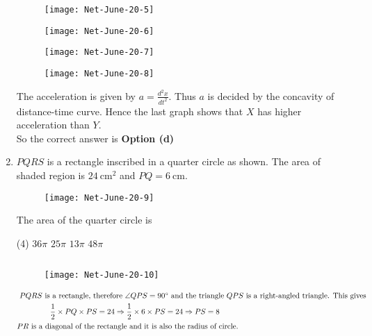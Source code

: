 \begin{enumerate}
\begin{tasks}
	\task[\textbf{a.}]
	\begin{figure}[H]
		\centering
		\texttt{[image: Net-June-20-5]}
	\end{figure}
	\task[\textbf{b.}]
		\begin{figure}[H]
		\centering
		\texttt{[image: Net-June-20-6]}
	\end{figure}
	\task[\textbf{c.}]
		\begin{figure}[H]
		\centering
		\texttt{[image: Net-June-20-7]}
	\end{figure}
	\task[\textbf{d.}] 
		\begin{figure}[H]
		\centering
		\texttt{[image: Net-June-20-8]}
	\end{figure}
\end{tasks}
\begin{answer}
	The acceleration is given by $a=\frac{d^{2} x}{d t^{2}}$. Thus $a$ is decided by the concavity of distance-time curve. Hence the last graph shows that $X$ has higher acceleration than $Y$.\\
		So the correct answer is \textbf{Option (d)}
\end{answer}
\item  $P Q R S$ is a rectangle inscribed in a quarter circle as shown. The area of shaded region is $24 \mathrm{~cm}^{2}$
and $P Q=6 \mathrm{~cm}$.	
	\begin{figure}[H]
	\centering
	\texttt{[image: Net-June-20-9]}
\end{figure}
The area of the quarter circle is
	 \begin{tasks}(4)
		\task[\textbf{a.}]$36 \pi$
		\task[\textbf{b.}]$25 \pi$
		\task[\textbf{c.}] $13 \pi$
		\task[\textbf{d.}] $48 \pi$
	\end{tasks}
\begin{answer}$\left. \right. $
		\begin{figure}[H]
		\centering
		\texttt{[image: Net-June-20-10]}
	\end{figure}
	\begin{align*}
\intertext{ $P Q R S$ is a rectangle, therefore $\angle Q P S=90^{\circ}$ and the triangle $Q P S$ is a right-angled triangle. This gives}
 \frac{1}{2} \times P Q \times P S&=24 \Rightarrow \frac{1}{2} \times 6 \times P S=24 \Rightarrow P S=8\\
	\text{$P R$ is a diagonal of the }&\text{rectangle and it is also the radius of circle.}\\

\end{align*}
\end{answer}
\end{enumerate}
